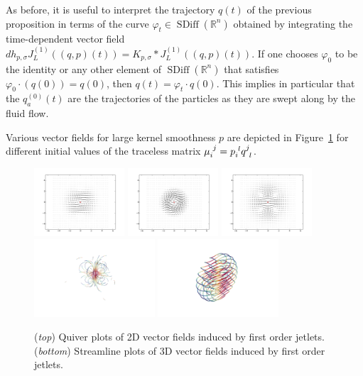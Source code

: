 \documentclass[12pt]{amsart}
\DeclareMathOperator{\SDiff}{SDiff}
\begin{document}
  As before, it is useful to interpret the trajectory $q(t)$ of the previous proposition in terms of the curve $\varphi_t \in  \SDiff(\mathbb{R}^n)$ obtained by integrating the time-dependent vector field $dh_{p, \sigma} J_L^{(1)}((q, p)(t)) = K_{p, \sigma} * J_L^{(1)}((q, p)(t))$. If one chooses $\varphi_0$ to be the identity or  any other element of $\SDiff(\mathbb{R}^n)$ that satisfies $\varphi_0 \cdot (q(0)) = q(0)$, then  $q(t) = \varphi_t \cdot  q(0)$. This implies in particular that the $q_a^{(0)}(t)$ are the trajectories of the particles as they are swept along by the fluid flow.

  Various vector fields for large kernel smoothness $p$
  are depicted in Figure~\ref{fig:zoo}
  for different initial values of the traceless matrix
  $\mu\indices{_i^j} = p\indices{_i^l} q\indices{^j_l}$.

  \begin{figure}
  	\centering
        \includegraphics[width=0.3\textwidth]{shear.pdf}
        \includegraphics[width=0.3\textwidth]{spin.pdf}
        \includegraphics[width=0.3\textwidth]{stretch.pdf}
        \\
        \includegraphics[width=0.4\textwidth]{stretch_3D.png}
        \includegraphics[width=0.4\textwidth]{shear_3D.png}
        \caption{(\emph{top}) Quiver plots of 2D vector fields induced by first order jetlets. 
        (\emph{bottom})   Streamline plots of 3D vector fields induced by first order jetlets.}
        \label{fig:zoo}
  \end{figure}
\end{document}
